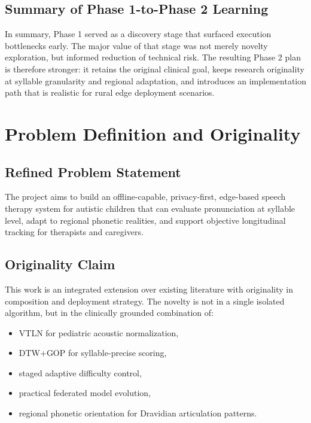 \documentclass[12pt,a4paper]{article}
\begin{document}
\subsection{Summary of Phase 1-to-Phase 2 Learning}
In summary, Phase 1 served as a discovery stage that surfaced execution bottlenecks early. The major value of that stage was not merely novelty exploration, but informed reduction of technical risk. The resulting Phase 2 plan is therefore stronger: it retains the original clinical goal, keeps research originality at syllable granularity and regional adaptation, and introduces an implementation path that is realistic for rural edge deployment scenarios.

\clearpage

\section{Problem Definition and Originality}
\subsection{Refined Problem Statement}
The project aims to build an offline-capable, privacy-first, edge-based speech therapy system for autistic children that can evaluate pronunciation at syllable level, adapt to regional phonetic realities, and support objective longitudinal tracking for therapists and caregivers.

\subsection{Originality Claim}
This work is an integrated extension over existing literature with originality in composition and deployment strategy. The novelty is not in a single isolated algorithm, but in the clinically grounded combination of:
\begin{itemize}[noitemsep,topsep=2pt]
\item VTLN for pediatric acoustic normalization,
\item DTW+GOP for syllable-precise scoring,
\item staged adaptive difficulty control,
\item practical federated model evolution,
\item regional phonetic orientation for Dravidian articulation patterns.
\end{itemize}
\end{document}

